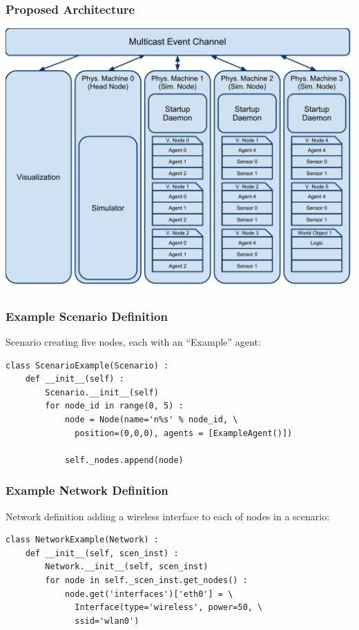 \documentclass[mathserif]{beamer}
\begin{document}
\frame
{
    \frametitle{Proposed Architecture}
    \begin{center}
        \includegraphics[scale=.5]{CTUSeminar.pdf}
    \end{center}
}

\begin{frame}[fragile]
    \frametitle{Example Scenario Definition}
    Scenario creating five nodes, each with an ``Example'' agent:
    {\tiny
    \begin{verbatim}
class ScenarioExample(Scenario) :
    def __init__(self) :
        Scenario.__init__(self)
        for node_id in range(0, 5) :
            node = Node(name='n%s' % node_id, \
              position=(0,0,0), agents = [ExampleAgent()])
            
            self._nodes.append(node)
    \end{verbatim}}
\end{frame}

\begin{frame}[fragile]
    \frametitle{Example Network Definition}
    Network definition adding a wireless interface to each of nodes in a scenario:
    {\tiny
    \begin{verbatim}
class NetworkExample(Network) :
    def __init__(self, scen_inst) :
        Network.__init__(self, scen_inst)
        for node in self._scen_inst.get_nodes() :
            node.get('interfaces')['eth0'] = \
              Interface(type='wireless', power=50, \
              ssid='wlan0')
    \end{verbatim}}
\end{frame}
\end{document}
